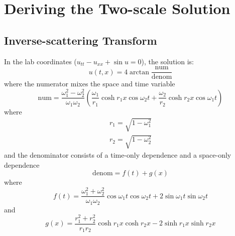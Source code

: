 \documentclass{report}
\begin{document}
\chapter{Deriving the Two-scale Solution}
\section{Inverse-scattering Transform}
In the lab coordinates ($u_{tt}-u_{xx}+\sin u=0$), the solution is:
\begin{equation}
  u(t,x)=4 \arctan \frac{\textrm{num}}{\textrm{denom}}
\end{equation}
where the numerator mixes the space and time variable
\begin{equation}
  \textrm{num} = \frac{\omega_1^2-\omega_2^2}{\omega_1 \omega_2} \left(\frac{\omega_1}{r_1} \cosh r_1 x \cos\omega_2 t + \frac{\omega_2}{r_2} \cosh r_2 x \cos\omega_1 t \right)
\end{equation}
where
\begin{subequations}
  \begin{align}
  r_1=\sqrt{1-\omega_1^2}\\
  r_2=\sqrt{1-\omega_2^2}
  \end{align}
\end{subequations}
and the denominator consists of a time-only dependence and a space-only dependence
\begin{equation}
    \textrm{denom} = f(t) + g(x)
\end{equation}
where
\begin{equation}
  f(t) = \frac{\omega_1^2+\omega_2^2}{\omega_1 \omega_2} \cos \omega_1 t \cos \omega_2 t +2 \sin \omega_1 t \sin \omega_2 t
\end{equation}
and
\begin{equation}
  g(x) = \frac{r_1^2+r_2^2}{r_1 r_2} \cosh r_1 x \cosh r_2 x-2  \sinh r_1 x \sinh r_2 x
\end{equation}
\end{document}
